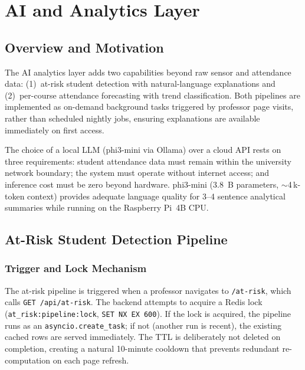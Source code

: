 \section{AI and Analytics Layer}
\label{sec:ai}

\subsection{Overview and Motivation}
\label{subsec:ai_overview}

The AI analytics layer adds two capabilities beyond raw sensor and
attendance data: (1)~at-risk student detection with natural-language
explanations and (2)~per-course attendance forecasting with trend
classification.  Both pipelines are implemented as on-demand background
tasks triggered by professor page visits, rather than scheduled nightly
jobs, ensuring explanations are available immediately on first access.

The choice of a local LLM (phi3-mini via Ollama) over a cloud API rests
on three requirements: student attendance data must remain within the
university network boundary; the system must operate without internet
access; and inference cost must be zero beyond hardware.  phi3-mini
(3.8~B parameters, $\sim$4\,k-token context) provides adequate language
quality for 3--4 sentence analytical summaries while running on the
Raspberry Pi~4B CPU.

\subsection{At-Risk Student Detection Pipeline}
\label{subsec:at_risk_pipeline}

\subsubsection{Trigger and Lock Mechanism}

The at-risk pipeline is triggered when a professor navigates to
\texttt{/at-risk}, which calls \texttt{GET /api/at-risk}.  The backend
attempts to acquire a Redis lock (\texttt{at\_risk:pipeline:lock},
\texttt{SET NX EX 600}).  If the lock is acquired, the pipeline runs as
an \texttt{asyncio.create\_task}; if not (another run is recent), the
existing cached rows are served immediately.  The TTL is deliberately
not deleted on completion, creating a natural 10-minute cooldown that
prevents redundant re-computation on each page refresh.

